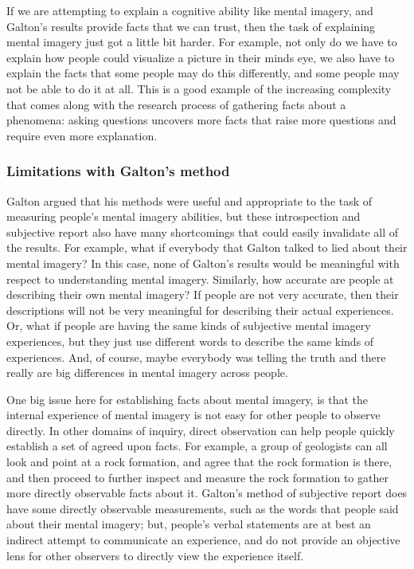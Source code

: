 \documentclass[
  oneside,
  12pt]{crumpbook}
\begin{document}
If we are attempting to explain a cognitive ability like mental imagery, and Galton's results provide facts that we can trust, then the task of explaining mental imagery just got a little bit harder. For example, not only do we have to explain how people could visualize a picture in their minds eye, we also have to explain the facts that some people may do this differently, and some people may not be able to do it at all. This is a good example of the increasing complexity that comes along with the research process of gathering facts about a phenomena: asking questions uncovers more facts that raise more questions and require even more explanation.

\hypertarget{limitations-with-galtons-method}{%
\subsubsection{Limitations with Galton's method}\label{limitations-with-galtons-method}}

Galton argued that his methods were useful and appropriate to the task of measuring people's mental imagery abilities, but these introspection and subjective report also have many shortcomings that could easily invalidate all of the results. For example, what if everybody that Galton talked to lied about their mental imagery? In this case, none of Galton's results would be meaningful with respect to understanding mental imagery. Similarly, how accurate are people at describing their own mental imagery? If people are not very accurate, then their descriptions will not be very meaningful for describing their actual experiences. Or, what if people are having the same kinds of subjective mental imagery experiences, but they just use different words to describe the same kinds of experiences. And, of course, maybe everybody was telling the truth and there really are big differences in mental imagery across people.

One big issue here for establishing facts about mental imagery, is that the internal experience of mental imagery is not easy for other people to observe directly. In other domains of inquiry, direct observation can help people quickly establish a set of agreed upon facts. For example, a group of geologists can all look and point at a rock formation, and agree that the rock formation is there, and then proceed to further inspect and measure the rock formation to gather more directly observable facts about it. Galton's method of subjective report does have some directly observable measurements, such as the words that people said about their mental imagery; but, people's verbal statements are at best an indirect attempt to communicate an experience, and do not provide an objective lens for other observers to directly view the experience itself.
\end{document}
